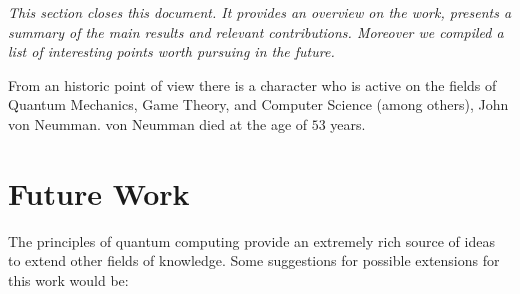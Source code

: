\label{cap:conclusions}

\textit{This section closes this document. It provides an overview on the work, presents a summary of the main results and relevant contributions. Moreover we compiled a list of interesting points worth pursuing in the future.}

From an historic point of view there is a character who is active on the fields of Quantum Mechanics, Game Theory, and Computer Science (among others), John von Neumman. von Neumman died at the age of $53$ years. 

\section{Future Work}
\label{sec:5FutureWork}

The principles of quantum computing provide an extremely rich source of ideas to extend other fields of knowledge.
Some suggestions for possible extensions for this work would be:

